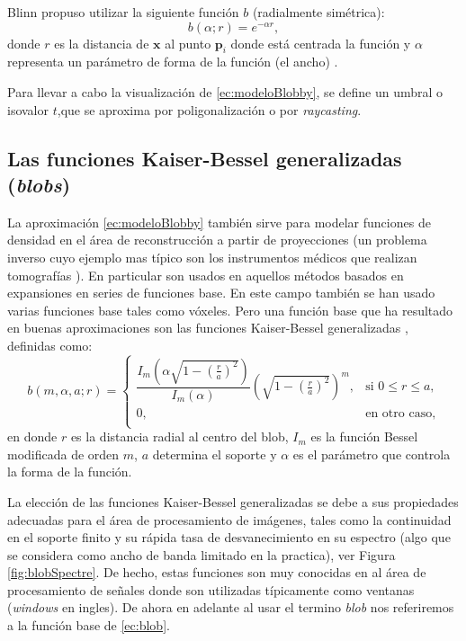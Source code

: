 Blinn propuso utilizar la siguiente función $b$ (radialmente simétrica):
\begin{equation}
 b(\alpha ; r) = e^{-\alpha r},
\label{ec:blobBlinn}
\end{equation}
donde $r$ es la distancia de $\textbf{x}$ al punto $\textbf{p}_i$ donde está centrada la función y $\alpha$ representa un parámetro de forma de la función (el ancho) .

Para llevar a cabo la visualización de \eqref{ec:modeloBlobby}, se define un umbral o isovalor $t$,que se aproxima por poligonalización o por \emph{raycasting}.

\subsection{Las funciones Kaiser-Bessel generalizadas (\textit{blobs})}

La aproximación \eqref{ec:modeloBlobby} también sirve para modelar funciones de densidad en el área de reconstrucción a partir de proyecciones (un problema inverso cuyo ejemplo mas típico son los instrumentos médicos que realizan tomografías \cite{tomografyBook}). En particular son usados en aquellos métodos basados en expansiones en series de funciones base. En este campo también se han usado varias funciones base tales como vóxeles. Pero una función base que ha resultado en buenas aproximaciones son las funciones Kaiser-Bessel generalizadas \cite{BlobsMate}, definidas como:
\begin{equation}
\label{ec:blob}
 b(m, \alpha, a; r) = \begin{cases}
            \dfrac{ I_m \left(  \alpha \sqrt{1 - \left( \frac{r}{a} \right) ^2 }  \right) } {I_m(\alpha)} \left( \sqrt{1 - \left( \frac{r}{a} \right) ^2 }  \right)^m, & \text{si $0 \leq r \leq a$,} \\
                    0, & \text{en otro caso,} \\
            \end{cases}
\end{equation}
en donde $r$ es la distancia radial al centro del blob, $I_m$ es la función Bessel modificada de orden $m$, $a$ determina el soporte y $\alpha$ es el parámetro que controla la forma de la función. 

La elección de las funciones Kaiser-Bessel generalizadas se debe a sus propiedades adecuadas para el área de procesamiento de imágenes, tales como la continuidad en el soporte finito y su rápida tasa de desvanecimiento en su espectro (algo que se considera como ancho de banda limitado en la practica), ver Figura \ref{fig:blobSpectre}. De hecho, estas funciones son muy conocidas en al área de procesamiento de señales donde son utilizadas típicamente como ventanas (\emph{windows} en ingles). De ahora en adelante al usar el termino \emph{blob} nos referiremos a la función base de \eqref{ec:blob}.

